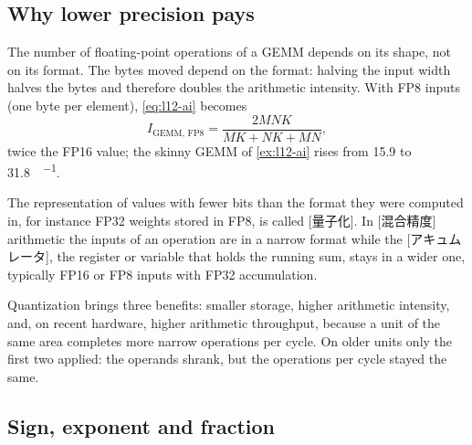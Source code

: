 \documentclass[../main.tex]{subfiles}
\begin{document}
\subsection{Why lower precision pays}

The number of floating-point operations of a GEMM depends on its shape,
not on its format.  The bytes moved depend on the format: halving the
input width halves the bytes and therefore doubles the arithmetic
intensity.  With FP8 inputs (one byte per element), \cref{eq:l12-ai}
becomes
\begin{equation}
  I_{\text{GEMM, FP8}} = \frac{2MNK}{MK + NK + MN} ,
  \label{eq:l12-ai-fp8}
\end{equation}
twice the FP16 value; the skinny GEMM of \cref{ex:l12-ai} rises from
15.9 to \SI{31.8}{\flop\per\byte}.

\begin{definition}
  The representation of values with fewer bits than the format they were computed in, for instance FP32
  weights stored in FP8, is called [量子化].  In
  [混合精度] arithmetic the inputs of an operation
  are in a narrow format while the
  [アキュムレータ], the register or variable that
  holds the running sum, stays in a wider one, typically FP16 or FP8
  inputs with FP32 accumulation.
\end{definition}

Quantization brings three benefits: smaller storage, higher arithmetic
intensity, and, on recent hardware, higher arithmetic throughput,
because a unit of the same area completes more narrow operations per
cycle.  On older units only the first two applied: the operands shrank,
but the operations per cycle stayed the same.

\subsection{Sign, exponent and fraction}
\end{document}
